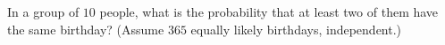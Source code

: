 In a group of $10$ people, what is the probability that at least two of them have the same birthday? (Assume $365$ equally likely birthdays, independent.)
